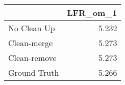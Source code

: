 \begin{tabular}{lr}
\toprule
{} & LFR_om_1 \\
\midrule
No Clean Up  &    5.232 \\
Clean-merge  &    5.273 \\
Clean-remove &    5.273 \\
Ground Truth &    5.266 \\
\bottomrule
\end{tabular}
